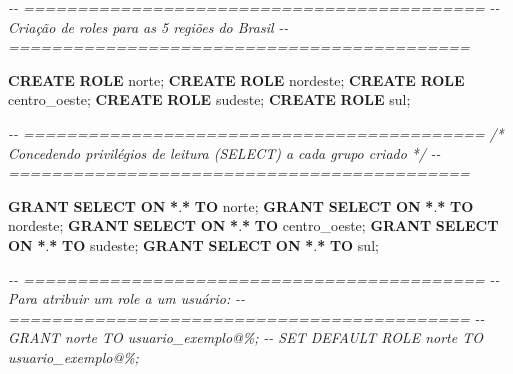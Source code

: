 \documentclass[
]{book}
\newenvironment{Shaded}{\begin{snugshade}}{\end{snugshade}}
\newcommand{\CommentTok}[1]{\textcolor[rgb]{0.56,0.35,0.01}{\textit{#1}}}
\newcommand{\KeywordTok}[1]{\textcolor[rgb]{0.13,0.29,0.53}{\textbf{#1}}}
\newcommand{\NormalTok}[1]{#1}
\newcommand{\OperatorTok}[1]{\textcolor[rgb]{0.81,0.36,0.00}{\textbf{#1}}}
\newcommand{\StringTok}[1]{\textcolor[rgb]{0.31,0.60,0.02}{#1}}
\begin{document}
\begin{Shaded}
\begin{Highlighting}[]
\CommentTok{{-}{-} ===========================================}
\CommentTok{{-}{-} Criação de roles para as 5 regiões do Brasil}
\CommentTok{{-}{-} ===========================================}

\KeywordTok{CREATE} \KeywordTok{ROLE} \StringTok{\textquotesingle{}norte\textquotesingle{}}\NormalTok{;}
\KeywordTok{CREATE} \KeywordTok{ROLE} \StringTok{\textquotesingle{}nordeste\textquotesingle{}}\NormalTok{;}
\KeywordTok{CREATE} \KeywordTok{ROLE} \StringTok{\textquotesingle{}centro\_oeste\textquotesingle{}}\NormalTok{;}
\KeywordTok{CREATE} \KeywordTok{ROLE} \StringTok{\textquotesingle{}sudeste\textquotesingle{}}\NormalTok{;}
\KeywordTok{CREATE} \KeywordTok{ROLE} \StringTok{\textquotesingle{}sul\textquotesingle{}}\NormalTok{;}

\CommentTok{{-}{-} ===========================================}
\CommentTok{/*}
\CommentTok{Concedendo privilégios de leitura (SELECT) a cada grupo criado}
\CommentTok{*/}
\CommentTok{{-}{-} ===========================================}

\KeywordTok{GRANT} \KeywordTok{SELECT} \KeywordTok{ON} \OperatorTok{*}\NormalTok{.}\OperatorTok{*} \KeywordTok{TO} \StringTok{\textquotesingle{}norte\textquotesingle{}}\NormalTok{;}
\KeywordTok{GRANT} \KeywordTok{SELECT} \KeywordTok{ON} \OperatorTok{*}\NormalTok{.}\OperatorTok{*} \KeywordTok{TO} \StringTok{\textquotesingle{}nordeste\textquotesingle{}}\NormalTok{;}
\KeywordTok{GRANT} \KeywordTok{SELECT} \KeywordTok{ON} \OperatorTok{*}\NormalTok{.}\OperatorTok{*} \KeywordTok{TO} \StringTok{\textquotesingle{}centro\_oeste\textquotesingle{}}\NormalTok{;}
\KeywordTok{GRANT} \KeywordTok{SELECT} \KeywordTok{ON} \OperatorTok{*}\NormalTok{.}\OperatorTok{*} \KeywordTok{TO} \StringTok{\textquotesingle{}sudeste\textquotesingle{}}\NormalTok{;}
\KeywordTok{GRANT} \KeywordTok{SELECT} \KeywordTok{ON} \OperatorTok{*}\NormalTok{.}\OperatorTok{*} \KeywordTok{TO} \StringTok{\textquotesingle{}sul\textquotesingle{}}\NormalTok{;}

\CommentTok{{-}{-} ===========================================}
\CommentTok{{-}{-} Para atribuir um role a um usuário:}
\CommentTok{{-}{-} ===========================================}
\CommentTok{{-}{-} GRANT \textquotesingle{}norte\textquotesingle{} TO \textquotesingle{}usuario\_exemplo\textquotesingle{}@\textquotesingle{}\%\textquotesingle{};}
\CommentTok{{-}{-} SET DEFAULT ROLE \textquotesingle{}norte\textquotesingle{} TO \textquotesingle{}usuario\_exemplo\textquotesingle{}@\textquotesingle{}\%\textquotesingle{};}
\end{Highlighting}
\end{Shaded}
\end{document}
